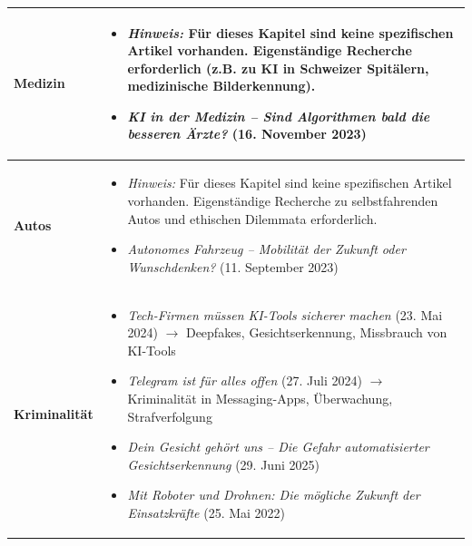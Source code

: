 \begin{longtable}{@{}lp{14cm}@{}}
	\textbf{Medizin} & 
	\begin{itemize}[leftmargin=*,noitemsep,topsep=0pt]
		\item \textit{Hinweis:} Für dieses Kapitel sind keine spezifischen Artikel vorhanden. Eigenständige Recherche erforderlich (z.B. zu KI in Schweizer Spitälern, medizinische Bilderkennung).
		\item[\faPlayCircle{}] \textit{KI in der Medizin -- Sind Algorithmen bald die besseren Ärzte?} (16. November 2023) \href{https://www.srf.ch/play/tv/nzz-format/video/ki-in-der-medizin---sind-algorithmen-bald-die-besseren-aerzte?urn=urn:srf:video:0d2820b2-175f-4832-b51e-8b4008963a8a}{\faLink}
	\end{itemize} \\
	\midrule
	
	\textbf{Autos} & 
	\begin{itemize}[leftmargin=*,noitemsep,topsep=0pt]
		\item \textit{Hinweis:} Für dieses Kapitel sind keine spezifischen Artikel vorhanden. Eigenständige Recherche zu selbstfahrenden Autos und ethischen Dilemmata erforderlich.
		\item[\faPlayCircle{}] \textit{Autonomes Fahrzeug -- Mobilität der Zukunft oder Wunschdenken?} (11. September 2023) \href{https://www.srf.ch/play/tv/einstein/video/autonomes-fahrzeug-mobilitaet-der-zukunft-oder-wunschdenken?urn=urn:srf:video:e107b861-fb6b-48e0-9471-4f55de35498c}{\faLink}
	\end{itemize} \\
	\midrule
	
	\textbf{Kriminalität} & 
	\begin{itemize}[leftmargin=*,noitemsep,topsep=0pt]
		\item[\faFilePdf{}] \textit{Tech-Firmen müssen KI-Tools sicherer machen} (23. Mai 2024) \newline
		$\rightarrow$ Deepfakes, Gesichtserkennung, Missbrauch von KI-Tools
		\item[\faFilePdf{}] \textit{Telegram ist für alles offen} (27. Juli 2024) \newline
		$\rightarrow$ Kriminalität in Messaging-Apps, Überwachung, Strafverfolgung
		\item[\faPlayCircle{}] \textit{Dein Gesicht gehört uns -- Die Gefahr automatisierter Gesichtserkennung} (29. Juni 2025) \href{https://www.srf.ch/play/tv/dok/video/dein-gesicht-gehoert-uns---die-gefahr-automatischer-gesichtserkennung?urn=urn:srf:video:6596261a-5936-4d5f-9c6c-51c985e91534}{\faLink}
		\item[\faPlayCircle{}] \textit{Mit Roboter und Drohnen: Die mögliche Zukunft der Einsatzkräfte} (25. Mai 2022) \href{https://www.srf.ch/play/tv/einstein/video/mit-roboter-und-drohnen-die-moegliche-zukunft-der-einsatzkraefte?urn=urn:srf:video:4b1b9ca9-32f2-44f3-a4fd-5ee02b59cbfa}{\faLink}
	\end{itemize} \\
	\midrule
	

\end{longtable}
